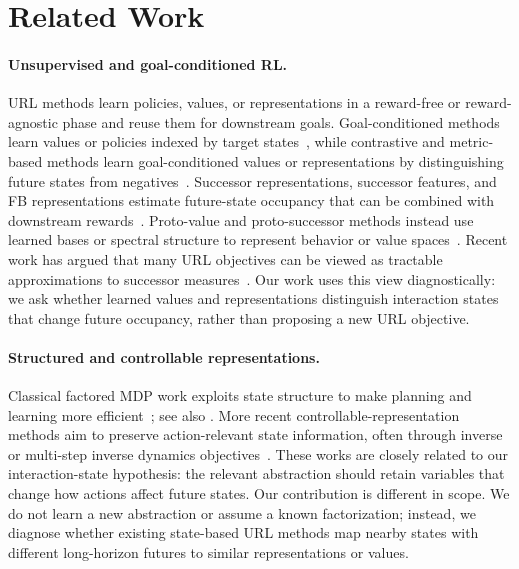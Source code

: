 \section{Related Work}
\label{sec:related}

\paragraph{Unsupervised and goal-conditioned RL.}
URL methods learn policies, values, or representations in a reward-free or reward-agnostic phase and reuse them for downstream goals.
Goal-conditioned methods learn values or policies indexed by target states~\citep{eysenbach-iclr21a,ma-neurips22a}, while contrastive and metric-based methods learn goal-conditioned values or representations by distinguishing future states from negatives~\citep{eysenbach-neurips22a,wang-icml23a,park-iclr24a}.
Successor representations, successor features, and FB representations estimate future-state occupancy that can be combined with downstream rewards~\citep{dayan-nc93a,barreto-neurips17a,touati-neurips21a,touati-iclr23a}.
Proto-value and proto-successor methods instead use learned bases or spectral structure to represent behavior or value spaces~\citep{mahadevan-icml05a,mahadevan-jmlr07a,farebrother-iclr23a,agarwal-arxiv25a}.
Recent work has argued that many URL objectives can be viewed as tractable approximations to successor measures~\citep{agarwal-rlj25a}.
Our work uses this view diagnostically: we ask whether learned values and representations distinguish interaction states that change future occupancy,
rather than proposing a new URL objective.

\paragraph{Structured and controllable representations.}
Classical factored MDP work exploits state structure to make planning and learning more efficient~\citep{boutilier-ijcai95a,kearns-ijcai99a,guestrin-jair03a}; see also \cite{mohan-jair24a}.
More recent controllable-representation methods aim to preserve action-relevant state information, often through inverse or multi-step inverse dynamics objectives~\citep{efroni-iclr22a,lamb-arxiv22a,levine-arxiv24a,rudolph-rlc24a}.
These works are closely related to our interaction-state hypothesis: the relevant abstraction should retain variables that change how actions affect future states.
Our contribution is different in scope.
We do not learn a new abstraction or assume a known factorization; instead, we diagnose whether existing state-based URL methods map nearby states with different long-horizon futures to similar representations or values.

